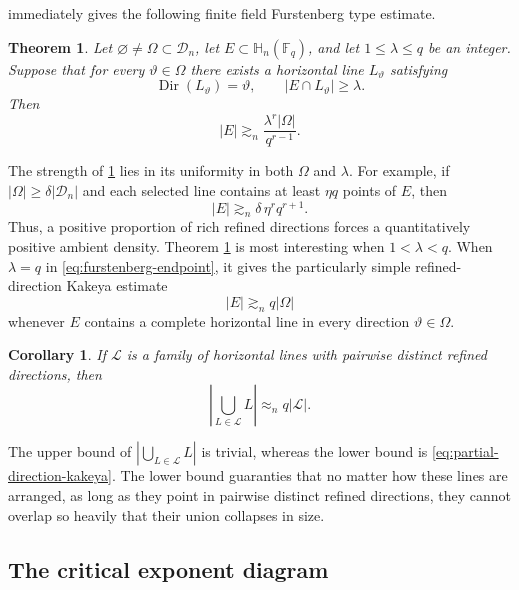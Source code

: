 \documentclass[11pt,letterpaper]{amsart}
\numberwithin{equation}{section}
\newtheorem{theorem}{Theorem}[section]
\newtheorem{corollary}[corollary]{Corollary}
\theoremstyle{definition}
\theoremstyle{remark}
\newcommand{\Fq}{\mathbb F_q}
\newcommand{\HH}{\mathbb H}
\newcommand{\Dn}{\mathcal D_n}
\newcommand{\Dir}{\operatorname{Dir}}
\begin{document}
immediately gives the following finite field Furstenberg type
estimate.
\begin{theorem}
\label{thm:furstenberg-application}
Let $\varnothing\neq\Omega\subset\Dn$, let
$E\subset\HH_n(\Fq)$, and let $1\leq\lambda\leq q$ be an integer.
Suppose that for every $\vartheta\in\Omega$ there exists a horizontal
line $L_\vartheta$ satisfying
\[
 \Dir(L_\vartheta)=\vartheta,
 \qquad
 |E\cap L_\vartheta|\geq\lambda.
\]
Then
\begin{equation}\label{eq:furstenberg-endpoint}
 |E|
 \gtrsim_n
 \frac{\lambda^r|\Omega|}{q^{r-1}}.
\end{equation}
\end{theorem}
The strength of \cref{thm:furstenberg-application} lies in its
uniformity in both $\Omega$ and $\lambda$.  For example, if
$|\Omega|\geq\delta|\Dn|$ and each selected line contains at least
$\eta q$ points of $E$, then
\begin{equation}\label{eq:robust-density}
 |E|
 \gtrsim_n
 \delta\,\eta^r q^{r+1}.
\end{equation}
Thus, a positive proportion of rich refined directions forces a
quantitatively positive ambient density. Theorem \ref{thm:furstenberg-application} is most interesting when $1<\lambda<q$. When $\lambda=q$ in \eqref{eq:furstenberg-endpoint}, it gives the particularly simple refined-direction Kakeya estimate
\begin{equation}\label{eq:partial-direction-kakeya}
 |E|\gtrsim_n q|\Omega|
\end{equation}
whenever $E$ contains a complete horizontal line in every direction
$\vartheta\in\Omega$.  

\begin{corollary}
    If $\mathcal L$ is a family of
horizontal lines with pairwise distinct refined directions, then
\begin{equation}\label{eq:union-distinct-directions}
 \left|\bigcup_{L\in\mathcal L}L\right|
 \approx_n q|\mathcal L|.
\end{equation}
\end{corollary}
The upper bound of $\left|\bigcup_{L\in\mathcal L}L\right|$ is trivial, whereas the lower bound is
\eqref{eq:partial-direction-kakeya}. The lower bound guaranties that no matter how these lines are arranged, as long as they point in pairwise distinct refined directions, they cannot overlap so heavily that their union collapses in size.
\subsection{The critical exponent diagram}
\end{document}
